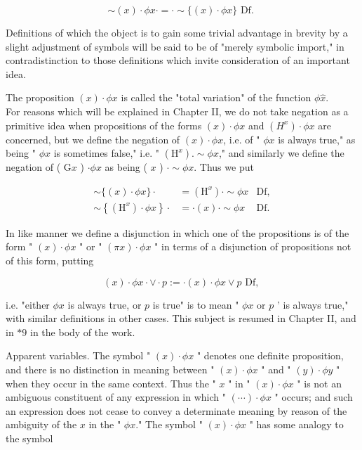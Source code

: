 \documentclass[10pt]{article}
\begin{document}
$$
\sim(x) \cdot \phi x \cdot=\cdot \sim\{(x) \cdot \phi x\} \text { Df. }
$$

Definitions of which the object is to gain some trivial advantage in brevity by a slight adjustment of symbols will be said to be of "merely symbolic import," in contradistinction to those definitions which invite consideration of an important idea.

The proposition $(x) \cdot \phi x$ is called the "total variation" of the function $\phi \hat{x}$.\\
For reasons which will be explained in Chapter II, we do not take negation as a primitive idea when propositions of the forms $(x) \cdot \phi x$ and $\left(H^{x}\right) \cdot \phi x$ are concerned, but we define the negation of $(x) \cdot \phi x$, i.e. of " $\phi x$ is always true," as being " $\phi x$ is sometimes false," i.e. " $\left(\mathrm{H}^{x}\right) . \sim \phi x$," and similarly we define the negation of ( $\mathrm{G} x$ ) $\cdot \phi x$ as being ( $x$ ) $\cdot \sim \phi x$. Thus we put

$$
\begin{array}{rrr}
\sim\{(x) \cdot \phi x\} \cdot & =\left(\mathrm{H}^{x}\right) \cdot \sim \phi x & \mathrm{Df}, \\
\sim\left\{\left(\mathrm{H}^{x}\right) \cdot \phi x\right\} \cdot & =\cdot(x) \cdot \sim \phi x & \mathrm{Df} .
\end{array}
$$

In like manner we define a disjunction in which one of the propositions is of the form " $(x) \cdot \phi x$ " or " $(\pi x) \cdot \phi x$ " in terms of a disjunction of propositions not of this form, putting

$$
(x) \cdot \phi x \cdot \vee \cdot p:=\cdot(x) \cdot \phi x \vee p \text { Df, }
$$

i.e. "either $\phi x$ is always true, or $p$ is true" is to mean " $\phi x$ or $p$ ' is always true," with similar definitions in other cases. This subject is resumed in Chapter II, and in $* 9$ in the body of the work.

Apparent variables. The symbol " $(x) \cdot \phi x$ " denotes one definite proposition, and there is no distinction in meaning between " $(x) \cdot \phi x$ " and " $(y) \cdot \phi y$ " when they occur in the same context. Thus the " $x$ " in " $(x) \cdot \phi x$ " is not an ambiguous constituent of any expression in which " $(\cdots) \cdot \phi x$ " occurs; and such an expression does not cease to convey a determinate meaning by reason of the ambiguity of the $x$ in the " $\phi x$." The symbol " $(x) \cdot \phi x$ " has some analogy to the symbol
\end{document}

